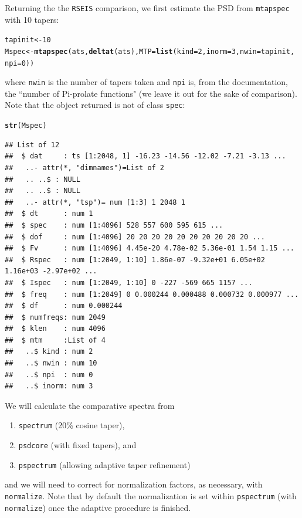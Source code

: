 \documentclass{article}\usepackage{graphicx, color}
\makeatletter
\newcommand{\hlfunctioncall}[1]{\textcolor[rgb]{0.501960784313725,0,0.329411764705882}{\textbf{#1}}}%
\newenvironment{kframe}{%
 \def\at@end@of@kframe{}%
 \ifinner\ifhmode%
  \def\at@end@of@kframe{\end{minipage}}%
  \begin{minipage}{\columnwidth}%
 \fi\fi%
 \def\FrameCommand##1{\hskip\@totalleftmargin \hskip-\fboxsep
 \colorbox{shadecolor}{##1}\hskip-\fboxsep
     \hskip-\linewidth \hskip-\@totalleftmargin \hskip\columnwidth}%
 \MakeFramed {\advance\hsize-\width
   \@totalleftmargin\z@ \linewidth\hsize
   \@setminipage}}%
 {\par\unskip\endMakeFramed%
 \at@end@of@kframe}
\newenvironment{knitrout}{}{} %
\newcommand{\Rcmd}[1]{\texttt{#1}}
\makeatother
\begin{document}
Returning the the \Rcmd{RSEIS} comparison, we first 
estimate the PSD from \Rcmd{mtapspec} with 10 tapers:
\begin{knitrout}
\color{fgcolor}\begin{kframe}
\begin{alltt}
tapinit <- 10
Mspec <- \hlfunctioncall{mtapspec}(ats, \hlfunctioncall{deltat}(ats), MTP = \hlfunctioncall{list}(kind = 2, inorm = 3, nwin = tapinit, 
    npi = 0))
\end{alltt}
\end{kframe}
\end{knitrout}

where \Rcmd{nwin} is the number of tapers taken and
\Rcmd{npi} is, from the documentation, the ``number of Pi-prolate functions" (we
leave it out for the sake of comparison). 
Note that the object returned
is not of class \Rcmd{spec}:
\begin{knitrout}
\color{fgcolor}\begin{kframe}
\begin{alltt}
\hlfunctioncall{str}(Mspec)
\end{alltt}
\begin{verbatim}
## List of 12
##  $ dat     : ts [1:2048, 1] -16.23 -14.56 -12.02 -7.21 -3.13 ...
##   ..- attr(*, "dimnames")=List of 2
##   .. ..$ : NULL
##   .. ..$ : NULL
##   ..- attr(*, "tsp")= num [1:3] 1 2048 1
##  $ dt      : num 1
##  $ spec    : num [1:4096] 528 557 600 595 615 ...
##  $ dof     : num [1:4096] 20 20 20 20 20 20 20 20 20 20 ...
##  $ Fv      : num [1:4096] 4.45e-20 4.78e-02 5.36e-01 1.54 1.15 ...
##  $ Rspec   : num [1:2049, 1:10] 1.86e-07 -9.32e+01 6.05e+02 1.16e+03 -2.97e+02 ...
##  $ Ispec   : num [1:2049, 1:10] 0 -227 -569 665 1157 ...
##  $ freq    : num [1:2049] 0 0.000244 0.000488 0.000732 0.000977 ...
##  $ df      : num 0.000244
##  $ numfreqs: num 2049
##  $ klen    : num 4096
##  $ mtm     :List of 4
##   ..$ kind : num 2
##   ..$ nwin : num 10
##   ..$ npi  : num 0
##   ..$ inorm: num 3
\end{verbatim}
\end{kframe}
\end{knitrout}


We will calculate the comparative spectra
from
\begin{enumerate}
  \item \Rcmd{spectrum} (20\% cosine taper),
  \item \Rcmd{psdcore} (with fixed tapers), and
  \item \Rcmd{pspectrum} (allowing adaptive taper refinement)
\end{enumerate}
and we will need to correct for normalization factors, as necessary, with
\Rcmd{normalize}. Note that by default the normalization is
set within \Rcmd{pspectrum} (with \Rcmd{normalize}) once the adaptive procedure
is finished.
\end{document}
